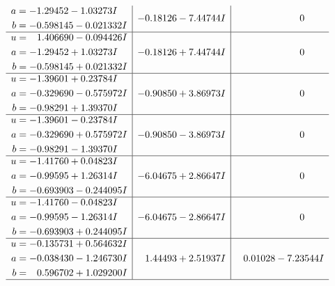 \documentclass[1p]{elsarticle_modified}
\theoremstyle{definition}
\begin{document}
$$\begin{array}{c|c|c}
\begin{aligned}
a &= -1.29452 - 1.03273 I \\
b &= -0.598145 - 0.021332 I\end{aligned}
 & -0.18126 - 7.44744 I & \phantom{-0.000000 } 0 \\ \hline\begin{aligned}
u &= \phantom{-}1.406690 - 0.094426 I \\
a &= -1.29452 + 1.03273 I \\
b &= -0.598145 + 0.021332 I\end{aligned}
 & -0.18126 + 7.44744 I & \phantom{-0.000000 } 0 \\ \hline\begin{aligned}
u &= -1.39601 + 0.23784 I \\
a &= -0.329690 - 0.575972 I \\
b &= -0.98291 + 1.39370 I\end{aligned}
 & -0.90850 + 3.86973 I & \phantom{-0.000000 } 0 \\ \hline\begin{aligned}
u &= -1.39601 - 0.23784 I \\
a &= -0.329690 + 0.575972 I \\
b &= -0.98291 - 1.39370 I\end{aligned}
 & -0.90850 - 3.86973 I & \phantom{-0.000000 } 0 \\ \hline\begin{aligned}
u &= -1.41760 + 0.04823 I \\
a &= -0.99595 + 1.26314 I \\
b &= -0.693903 - 0.244095 I\end{aligned}
 & -6.04675 + 2.86647 I & \phantom{-0.000000 } 0 \\ \hline\begin{aligned}
u &= -1.41760 - 0.04823 I \\
a &= -0.99595 - 1.26314 I \\
b &= -0.693903 + 0.244095 I\end{aligned}
 & -6.04675 - 2.86647 I & \phantom{-0.000000 } 0 \\ \hline\begin{aligned}
u &= -0.135731 + 0.564632 I \\
a &= -0.038430 - 1.246730 I \\
b &= \phantom{-}0.596702 + 1.029200 I\end{aligned}
 & \phantom{-}1.44493 + 2.51937 I & \phantom{-}0.01028 - 7.23544 I\\
 \hline 
 \end{array}$$\newpage$$\begin{array}{c|c|c}  

\end{array}$$
\end{document}
